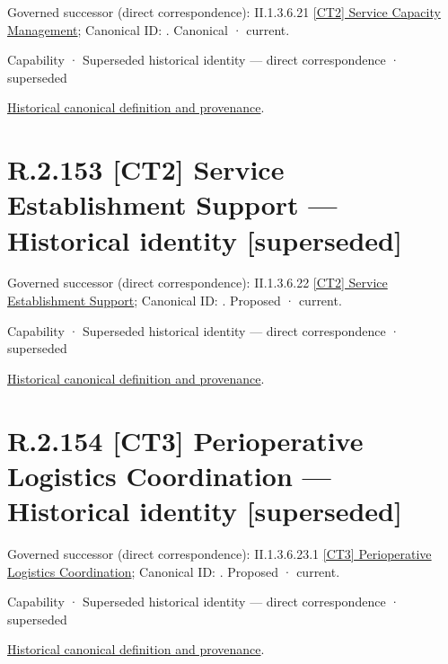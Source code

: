 {\small Governed successor (direct correspondence): II.1.3.6.21 \hyperref[element:d86105bf9c86445394088f65c895d37f]{[CT2] Service Capacity Management}; Canonical ID: \texttt{}. Canonical · current.}\par
\label{element:ac205f374c9d41c3b6d18a6b7c356152}
{\small Capability · Superseded historical identity — direct correspondence · superseded}\par
\href{../../../../continuum/strategy/capability/ac205f374c9d41c3b6d18a6b7c356152.md}{Historical canonical definition and provenance}.\par
\section*{R.2.153 [CT2] Service Establishment Support — Historical identity [superseded]}
\label{navigation:R.2.153}

{\small Governed successor (direct correspondence): II.1.3.6.22 \hyperref[element:20e67a41e7f44398b0f0cf3d379d8b9c]{[CT2] Service Establishment Support}; Canonical ID: \texttt{}. Proposed · current.}\par
\label{element:8a63b08f34fa42c5bda2a3e12b9ecd55}
{\small Capability · Superseded historical identity — direct correspondence · superseded}\par
\href{../../../../continuum/strategy/capability/8a63b08f34fa42c5bda2a3e12b9ecd55.md}{Historical canonical definition and provenance}.\par
\section*{R.2.154 [CT3] Perioperative Logistics Coordination — Historical identity [superseded]}
\label{navigation:R.2.154}

{\small Governed successor (direct correspondence): II.1.3.6.23.1 \hyperref[element:6b7c08b60b5b48519bfe4b6f993dd6fb]{[CT3] Perioperative Logistics Coordination}; Canonical ID: \texttt{}. Proposed · current.}\par
\label{element:e7813a06b9df462fa135c299261f192e}
{\small Capability · Superseded historical identity — direct correspondence · superseded}\par
\href{../../../../continuum/strategy/capability/e7813a06b9df462fa135c299261f192e.md}{Historical canonical definition and provenance}.\par
